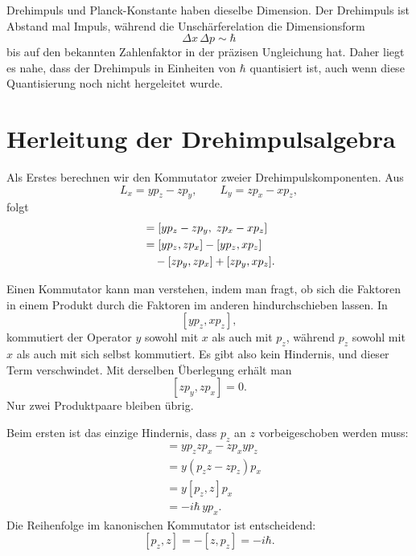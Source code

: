 Drehimpuls und Planck-Konstante haben dieselbe Dimension. Der Drehimpuls ist Abstand mal Impuls, während die Unschärferelation die Dimensionsform
\begin{equation}
\Delta x\,\Delta p\sim\hbar
\end{equation}
bis auf den bekannten Zahlenfaktor in der präzisen Ungleichung hat. Daher liegt es nahe, dass der Drehimpuls in Einheiten von \(\hbar\) quantisiert ist, auch wenn diese Quantisierung noch nicht hergeleitet wurde.

\section{Herleitung der Drehimpulsalgebra}

Als Erstes berechnen wir den Kommutator zweier Drehimpulskomponenten. Aus
\[
L_x=yp_z-zp_y,\qquad
L_y=zp_x-xp_z,
\]
folgt
\begin{align}
[L_x,L_y]
&=[yp_z-zp_y,\;zp_x-xp_z] \\
&=[yp_z,zp_x]-[yp_z,xp_z] \notag\\
&\quad{}-[zp_y,zp_x]+[zp_y,xp_z].
\end{align}

\begin{classroomqa}
\end{classroomqa}

Einen Kommutator kann man verstehen, indem man fragt, ob sich die Faktoren in einem Produkt durch die Faktoren im anderen hindurchschieben lassen. In
\[
[yp_z,xp_z],
\]
kommutiert der Operator \(y\) sowohl mit \(x\) als auch mit \(p_z\), während \(p_z\) sowohl mit \(x\) als auch mit sich selbst kommutiert. Es gibt also kein Hindernis, und dieser Term verschwindet. Mit derselben Überlegung erhält man
\[
[zp_y,zp_x]=0.
\]
Nur zwei Produktpaare bleiben übrig.

Beim ersten ist das einzige Hindernis, dass \(p_z\) an \(z\) vorbeigeschoben werden muss:
\begin{align}
[yp_z,zp_x]
&=yp_zzp_x-zp_xyp_z \\
&=y(p_zz-zp_z)p_x \\
&=y[p_z,z]p_x \\
&=-i\hbar\,yp_x.
\end{align}
Die Reihenfolge im kanonischen Kommutator ist entscheidend:
\[
[p_z,z]=-[z,p_z]=-i\hbar.
\]

